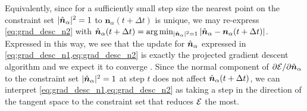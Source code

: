 Equivalently, since for a sufficiently small step size the nearest point on the constraint set $|\hat{\bm{n}}_\alpha|^2=1$ to $\bm{n}_\alpha(t+\Delta t)$ is unique, we may re-express \cref{eq:grad_desc_n2} with $\hat{\bm{n}}_\alpha(t + \Delta t) = \arg \min_{|\hat{\bm{n}}_\alpha|^2 = 1} |\hat{\bm{n}}_\alpha - \bm{n}_\alpha(t+\Delta t)|$.
Expressed in this way, we see that the update for $\hat{\bm{n}}_\alpha$ expressed in \cref{eq:grad_desc_n1,eq:grad_desc_n2} is exactly the projected gradient descent algorithm and we expect it to converge \citep{eicke1992}.
Since the normal component of $\partial \mathcal{E} / \partial \hat{\bm{n}}_\alpha$ to the constraint set $|\hat{\bm{n}}_\alpha|^2 = 1$ at step $t$ does not affect $\hat{\bm{n}}_\alpha(t + \Delta t)$, we can interpret \cref{eq:grad_desc_n1,eq:grad_desc_n2} as taking a step in the direction of the tangent space to the constraint set that reduces $\mathcal{E}$ the most.

